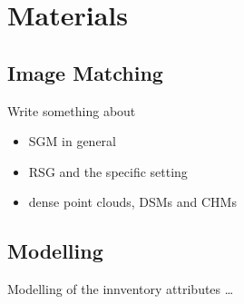 \chapter{Materials}
\label{chp:Mat}



\section{Image Matching}\label{ImgMatch}

Write something about 
\begin{itemize}
	\item SGM in general
	\item RSG and the specific setting
	\item dense point clouds, DSMs and CHMs
\end{itemize} 


\section{Modelling}\label{sec:Model}

Modelling of the innventory attributes \dots

